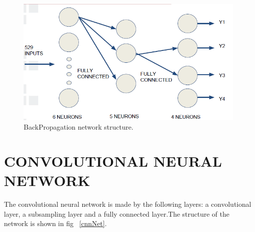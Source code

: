 \documentclass[a4paper, 10pt, conference]{ieeeconf}      %
\begin{document}
\begin{figure}[thpb]
	\includegraphics[scale=0.4]{bp.png}
	\caption{BackPropagation network structure.}
	\label{bp}
\end{figure}

\section{CONVOLUTIONAL NEURAL NETWORK}\label{sec:cnn}
The convolutional neural network is made by the following layers: a convolutional layer, a subsampling layer and a fully connected layer.The structure of the network is shown in fig  ~\ref{cnnNet}. 
\end{document}
